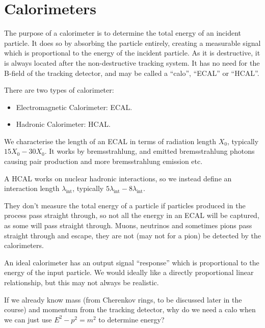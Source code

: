 \section{Calorimeters}
The purpose of a calorimeter is to determine the total energy of an incident particle. It does so by absorbing the particle entirely, creating a measurable signal which is proportional to the energy of the incident particle. As it is destructive, it is always located after the non-destructive tracking system. It has no need for the B-field of the tracking detector, and may be called a ``calo'', ``ECAL'' or ``HCAL''.

There are two types of calorimeter:
\begin{itemize}
    \item Electromagnetic Calorimeter: ECAL.
    \item Hadronic Calorimeter: HCAL.
\end{itemize}

We characterise the length of an ECAL in terms of radiation length $X_0$, typically $15X_0 - 30X_0$. It works by bremsstrahlung, and emitted bremsstrahlung photons causing pair production and more bremsstrahlung emission etc.

A HCAL works on nuclear hadronic interactions, so we instead define an interaction length $\lambda_\text{int}$, typically $5 \lambda_\text{int} - 8 \lambda_\text{int}$. 

They don't measure the total energy of a particle if particles produced in the process pass straight through, so not all the energy in an ECAL will be captured, as some will pass straight through. Muons, neutrinos and sometimes pions pass straight through and escape, they are not (may not for a pion) be detected by the calorimeters.

An ideal calorimeter has an output signal ``response'' which is proportional to the energy of the input particle. We would ideally like a directly proportional linear relationship, but this may not always be realistic.

If we already know mass (from Cherenkov rings, to be discussed later in the course) and momentum from the tracking detector, why do we need a calo when we can just use $E^2 - p^2 = m^2$ to determine energy?

